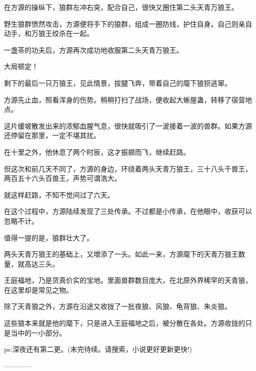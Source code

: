 \begin{this_body}
在方源的操纵下，狼群左冲右突，配合自己，很快又圈住第二头天青万狼王。

野生狼群愤然攻击，方源便将手下的狼群，组成一圈防线，护住自身。自己则亲自动手，和万狼王绞杀在一起。

一盏茶的功夫后，方源再次成功地收服第二头天青万狼王。

大局顿定！

剩下的最后一只万狼王，见此情景，拔腿飞奔，带着自己的麾下狼狈逃窜。

方源先止血，照看浑身的伤势。稍稍打扫了战场，便收起大蜥屋蛊，转移了宿营地点。

这片缓坡散发出来的浓郁血腥气息，很快就吸引了一波接着一波的兽群。如果方源还停留在那里，一定不堪其扰。

在十里之外，他休息了两个时辰，这才振翅而飞，继续赶路。

但这次和前几天不同了，方源的身边，环绕着两头天青万狼王，三十八头千兽王，两百五十六头百兽王，声势可谓浩大。

就这样赶路，不知不觉间过了六天。

在这个过程中，方源陆续发现了三处传承。不过都是小传承，在他眼中，收获可以忽略不计。

值得一提的是，狼群壮大了。

两头天青万狼王的基础上，又增添了一头。如此一来，方源麾下的天青万狼王数量，就高达三头。

王庭福地，乃是货真价实的宝地。里面兽群数目庞大，在北原外界稀罕的天青狼，在这里却是常见之物。

除了天青狼之外，方源在沿途又收拢了一批夜狼、风狼、龟背狼、朱炎狼。

这些狼本来就是他的麾下，只是进入王庭福地之后，被分散在各处。方源收拢的只是当中的一小部分。

ps:深夜还有第二更。(未完待续。请搜索，小说更好更新更快!)

------------

\end{this_body}

